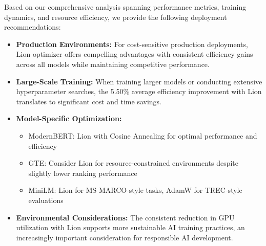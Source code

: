 Based on our comprehensive analysis spanning performance metrics, training dynamics, and resource efficiency, we provide the following deployment recommendations:

\begin{itemize}
    \item \textbf{Production Environments:} For cost-sensitive production deployments, Lion optimizer offers compelling advantages with consistent efficiency gains across all models while maintaining competitive performance.
    
    \item \textbf{Large-Scale Training:} When training larger models or conducting extensive hyperparameter searches, the 5.50\% average efficiency improvement with Lion translates to significant cost and time savings.
    
    \item \textbf{Model-Specific Optimization:} 
    \begin{itemize}
        \item ModernBERT: Lion with Cosine Annealing for optimal performance and efficiency
        \item GTE: Consider Lion for resource-constrained environments despite slightly lower ranking performance
        \item MiniLM: Lion for MS MARCO-style tasks, AdamW for TREC-style evaluations
    \end{itemize}
    
    \item \textbf{Environmental Considerations:} The consistent reduction in GPU utilization with Lion supports more sustainable AI training practices, an increasingly important consideration for responsible AI development.
\end{itemize}

